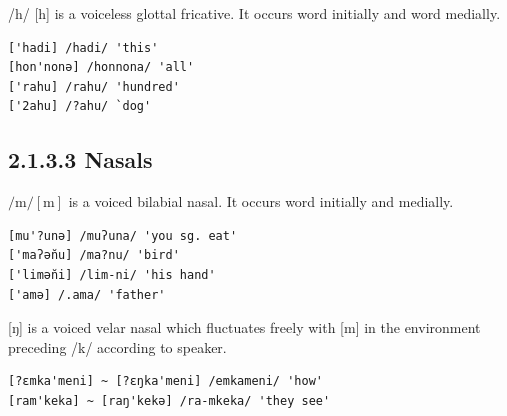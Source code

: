 \documentclass[10pt]{article}
\begin{document}
/h/ [h] is a voiceless glottal fricative. It occurs word initially and word medially.

\begin{verbatim}
['hadi] /hadi/ 'this'
[hon'nonә] /honnona/ 'all'
['rahu] /rahu/ 'hundred'
['2ahu] /?ahu/ `dog'
\end{verbatim}

\subsection*{2.1.3.3 Nasals}
\(/ \mathrm{m} /[\mathrm{m}]\) is a voiced bilabial nasal. It occurs word initially and medially.

\begin{verbatim}
[mu'?unә] /muʔuna/ 'you sg. eat'
['maʔә̆nu] /ma?nu/ 'bird'
['limә̆ni] /lim-ni/ 'his hand'
['amә] /.ama/ 'father'
\end{verbatim}

[ŋ] is a voiced velar nasal which fluctuates freely with [m] in the environment preceding /k/ according to speaker.

\begin{verbatim}
[?ɛmka'meni] ~ [?ɛŋka'meni] /emkameni/ 'how'
[ram'keka] ~ [raŋ'kekə] /ra-mkeka/ 'they see'
\end{verbatim}
\end{document}
